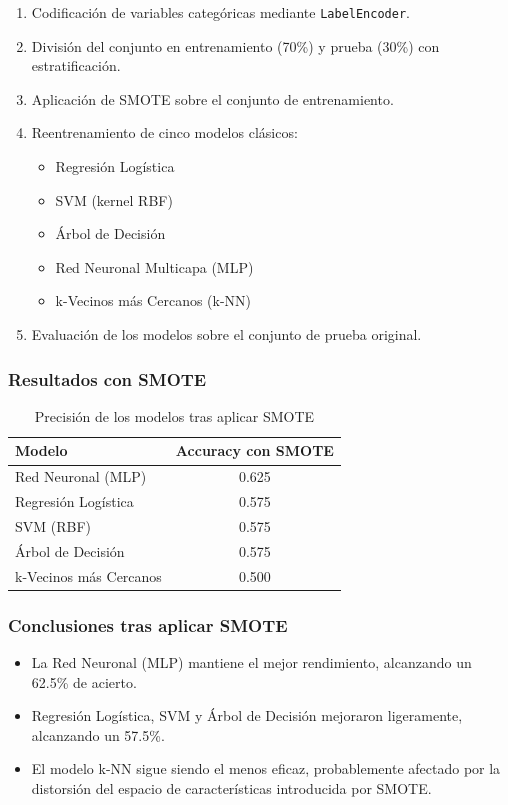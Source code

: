\documentclass[11pt,a4paper]{article}
\begin{document}
\begin{enumerate}
    \item Codificación de variables categóricas mediante \texttt{LabelEncoder}.
    \item División del conjunto en entrenamiento (70\%) y prueba (30\%) con estratificación.
    \item Aplicación de SMOTE sobre el conjunto de entrenamiento.
    \item Reentrenamiento de cinco modelos clásicos:
    \begin{itemize}
        \item Regresión Logística
        \item SVM (kernel RBF)
        \item Árbol de Decisión
        \item Red Neuronal Multicapa (MLP)
        \item k-Vecinos más Cercanos (k-NN)
    \end{itemize}
    \item Evaluación de los modelos sobre el conjunto de prueba original.
\end{enumerate}

\subsubsection*{Resultados con SMOTE}

\begin{table}[H]
\centering
\begin{tabular}{lc}
\toprule
\textbf{Modelo} & \textbf{Accuracy con SMOTE} \\
\midrule
Red Neuronal (MLP) & 0.625 \\
Regresión Logística & 0.575 \\
SVM (RBF) & 0.575 \\
Árbol de Decisión & 0.575 \\
k-Vecinos más Cercanos & 0.500 \\
\bottomrule
\end{tabular}
\caption{Precisión de los modelos tras aplicar SMOTE}
\end{table}

\subsubsection*{Conclusiones tras aplicar SMOTE}

\begin{itemize}
    \item La Red Neuronal (MLP) mantiene el mejor rendimiento, alcanzando un 62.5\% de acierto.
    \item Regresión Logística, SVM y Árbol de Decisión mejoraron ligeramente, alcanzando un 57.5\%.
    \item El modelo k-NN sigue siendo el menos eficaz, probablemente afectado por la distorsión del espacio de características introducida por SMOTE.
\end{itemize}
\end{document}
